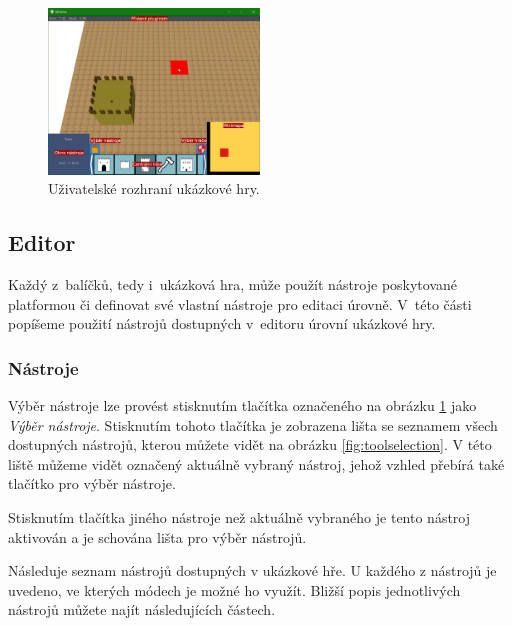 \begin{figure}[h]
	\centering
	\includegraphics[width=0.5\textwidth]{img/GameUI.png}
	\caption{Uživatelské rozhraní ukázkové hry.}
	\label{fig:UI}
\end{figure}

\subsection{Editor}
Každý z~balíčků, tedy i~ukázková hra, může použít nástroje poskytované platformou či definovat své vlastní nástroje pro editaci úrovně. V~této části popíšeme použití nástrojů dostupných v~editoru úrovní ukázkové hry.

\subsubsection{Nástroje}

Výběr nástroje lze provést stisknutím tlačítka označeného na obrázku \ref{fig:UI} jako \textit{Výběr nástroje}. Stisknutím tohoto tlačítka je zobrazena lišta se seznamem všech dostupných nástrojů, kterou můžete vidět na obrázku \ref{fig:toolselection}. V této liště můžeme vidět označený aktuálně vybraný nástroj, jehož vzhled přebírá také tlačítko pro výběr nástroje. 

Stisknutím tlačítka jiného nástroje než aktuálně vybraného je tento nástroj aktivován a je schována lišta pro výběr nástrojů.

Následuje seznam nástrojů dostupných v ukázkové hře. U každého z nástrojů je uvedeno, ve kterých módech je možné ho využít. Bližší popis jednotlivých nástrojů můžete najít následujících částech.

\medskip
{}

